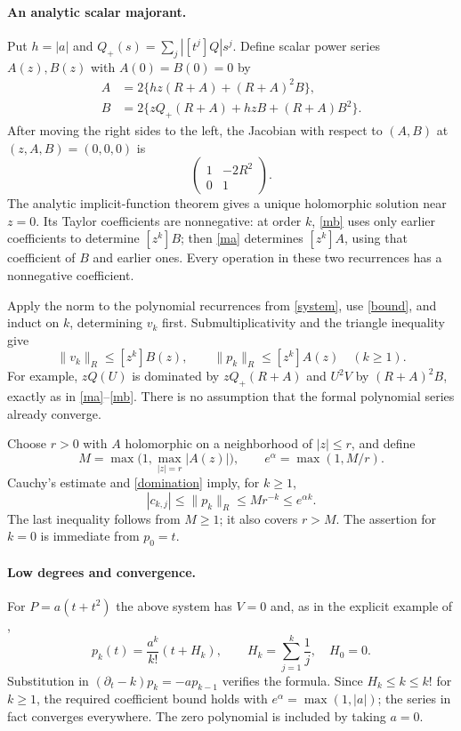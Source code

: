 \documentclass[11pt]{article}
\newcommand{\norm}[1]{\lVert #1\rVert_R}
\begin{document}
\paragraph{An analytic scalar majorant.}
Put $h=|a|$ and $Q_+(s)=\sum_j|[t^j]Q|s^j$.
Define scalar power series $A(z),B(z)$ with $A(0)=B(0)=0$ by
\begin{subequations}
\begin{align}
 A&=2\{hz(R+A)+(R+A)^2B\},\label{ma}\\
 B&=2\{zQ_+(R+A)+hzB+(R+A)B^2\}.\label{mb}
\end{align}
\end{subequations}
After moving the right sides to the left, the Jacobian with respect to
$(A,B)$ at $(z,A,B)=(0,0,0)$ is
\[
 \begin{pmatrix}1&-2R^2\\0&1\end{pmatrix}.
\]
The analytic implicit-function theorem gives a unique holomorphic
solution near $z=0$.
Its Taylor coefficients are nonnegative: at order $k$, \eqref{mb}
uses only earlier coefficients to determine $[z^k]B$; then \eqref{ma}
determines $[z^k]A$, using that coefficient of $B$ and earlier ones.
Every operation in these two recurrences has a nonnegative coefficient.

Apply the norm to the polynomial recurrences from \eqref{system},
use \eqref{bound}, and induct on $k$, determining $v_k$ first.
Submultiplicativity and the triangle inequality give
\begin{equation}\label{domination}
 \norm{v_k}\leq[z^k]B(z),\qquad
 \norm{p_k}\leq[z^k]A(z)\quad(k\geq1).
\end{equation}
For example, $zQ(U)$ is dominated by $zQ_+(R+A)$ and $U^2V$
by $(R+A)^2B$, exactly as in \eqref{ma}--\eqref{mb}.
There is no assumption that the formal polynomial series already converge.

Choose $r>0$ with $A$ holomorphic on a neighborhood of $|z|\leq r$,
and define
\[
 M=\max\bigl(1,\max_{|z|=r}|A(z)|\bigr),\qquad
 e^\alpha=\max(1,M/r).
\]
Cauchy's estimate and \eqref{domination} imply, for $k\geq1$,
\[
 |c_{k,j}|\leq\norm{p_k}\leq Mr^{-k}\leq e^{\alpha k}.
\]
The last inequality follows from $M\geq1$; it also covers $r>M$.
The assertion for $k=0$ is immediate from $p_0=t$.

\paragraph{Low degrees and convergence.}
For $P=a(t+t^2)$ the above system has $V=0$ and, as in the
explicit example of \cite[Section 4]{necessary},
\[
 p_k(t)=\frac{a^k}{k!}(t+H_k),\qquad
 H_k=\sum_{j=1}^k\frac1j,\quad H_0=0.
\]
Substitution in $(\partial_t-k)p_k=-ap_{k-1}$ verifies the formula.
Since $H_k\leq k\leq k!$ for $k\geq1$, the required coefficient
bound holds with $e^\alpha=\max(1,|a|)$; the series in fact converges
everywhere. The zero polynomial is included by taking $a=0$.
\end{document}
